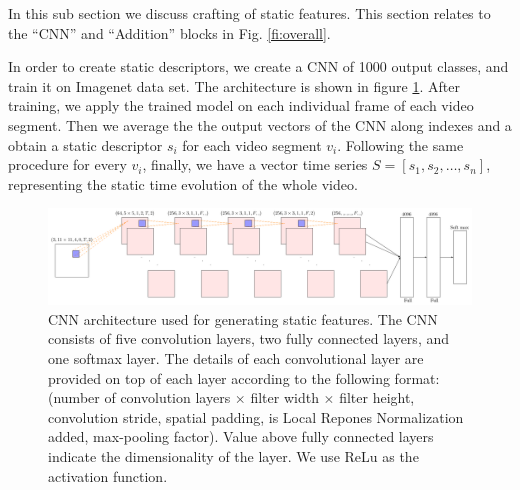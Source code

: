 In this sub section we discuss crafting of static features. This section relates to
the ``CNN'' and ``Addition'' blocks in Fig. \ref{fi:overall}.

In order to create static descriptors, we create a CNN of 1000 output classes, and train it on Imagenet data set. The architecture is shown in figure \ref{fi:cnn}.
After training, we apply the trained model on each individual frame of each video segment. Then we average the the output vectors of the CNN
along indexes and a obtain a static descriptor $s_{i}$ for each video segment $v_{i}$. Following the same
procedure for every $v_{i}$, finally, we have a vector time series
$S =[s_{1}, s_{2}, \dots, s_{n}]$, representing the static time evolution of the whole video.

\begin{figure}
  \centering
  \includegraphics[scale=0.5]{./figures/nw.pdf}
  \caption{CNN architecture used for generating static features. The CNN consists of five convolution layers,
  two fully connected layers, and one softmax layer. The details of each convolutional layer are provided on top of each layer
  according to the following format:(number of convolution layers $\times$ filter width $\times$ filter height, convolution stride,
  spatial padding, is Local Repones Normalization added, max-pooling factor). Value above fully connected layers indicate the dimensionality of the layer.
  We use ReLu as the activation function.}
\label{fi:cnn}
\end{figure} 